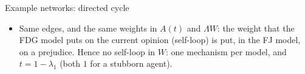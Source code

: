 \documentclass[10pt, aspectratio=169]{beamer}
\begin{document}
\begin{frame}[label=m-fj-graphs]{Example networks: directed cycle}
  \medskip
  \footnotesize
  \begin{itemize}
    \item Same edges, and the same weights in $A(t)$ and $\Lambda W$: the weight that the
          FDG model puts on the \alert{current opinion} (self-loop) is put, in the FJ
          model, on a \alert{prejudice}. Hence no self-loop in $W$: one mechanism per
          model, and $t = 1 - \lambda_1$ (both $1$ for a stubborn agent).
  \end{itemize}
\end{frame}
\end{document}
